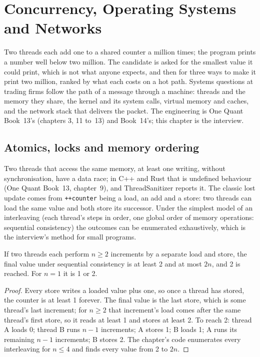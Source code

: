 \chapter{Concurrency, Operating Systems and Networks}\label{ch:iv:concurrency-operating-systems-and-networks}

Two threads each add one to a shared counter a million times; the program prints a number well below two million. The
candidate is asked for the smallest value it could print, which is not what anyone expects, and then for three ways to make it
print two million, ranked by what each costs on a hot path. Systems questions at trading firms follow the path of a message
through a machine: threads and the memory they share, the kernel and its system calls, virtual memory and caches, and the
network stack that delivers the packet. The engineering is One Quant Book~13's (chapters 3, 11 to~13) and Book~14's; this
chapter is the interview.

\section{Atomics, locks and memory ordering}

Two threads that access the same memory, at least one writing, without synchronisation, have a data race; in C++ and Rust that
is undefined behaviour (One Quant Book~13, chapter~9), and ThreadSanitizer reports it. The classic lost update comes from
\texttt{++counter} being a load, an add and a store: two threads can load the same value and both store its successor. Under the
simplest model of an interleaving (each thread's steps in order, one global order of memory operations: sequential
consistency) the outcomes can be enumerated exhaustively, which is the interview's method for small programs.

\begin{proposition}\label{prop:iv:concurrency-operating-systems-and-networks:counter}
If two threads each perform $n \ge 2$ increments by a separate load and store, the final value under sequential consistency is
at least 2 and at most $2n$, and 2 is reached. For $n = 1$ it is 1 or 2.
\end{proposition}

\begin{proof}
Every store writes a loaded value plus one, so once a thread has stored, the counter is at least 1 forever. The final value is the
last store, which is some thread's last increment; for $n \ge 2$ that increment's load comes after the same thread's first store, so
it reads at least 1 and stores at least 2. To reach 2: thread A loads 0; thread B runs $n - 1$ increments; A stores 1; B loads 1; A
runs its remaining $n - 1$ increments; B stores 2. The chapter's code enumerates every interleaving for $n \le 4$ and finds every
value from 2 to $2n$.
\end{proof}

